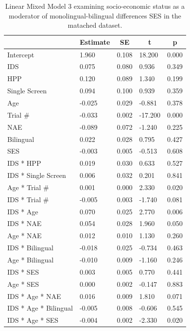 \documentclass[,man,floatsintext]{apa6}
\begin{document}
\begin{table}[tbp]

\begin{center}
\begin{threeparttable}

\caption{\label{tab:unnamed-chunk-11}Linear Mixed Model 3 examining socio-economic status as a moderator of monolingual-bilingual differences SES in the matached dataset.}

\begin{tabular}{lllll}
\toprule
 & \multicolumn{1}{c}{Estimate} & \multicolumn{1}{c}{SE} & \multicolumn{1}{c}{t} & \multicolumn{1}{c}{p}\\
\midrule
Intercept & 1.960 & 0.108 & 18.200 & 0.000\\
IDS & 0.075 & 0.080 & 0.936 & 0.349\\
HPP & 0.120 & 0.089 & 1.340 & 0.199\\
Single Screen & 0.094 & 0.100 & 0.939 & 0.359\\
Age & -0.025 & 0.029 & -0.881 & 0.378\\
Trial \# & -0.033 & 0.002 & -17.200 & 0.000\\
NAE & -0.089 & 0.072 & -1.240 & 0.225\\
Bilingual & 0.022 & 0.028 & 0.795 & 0.427\\
SES & -0.003 & 0.005 & -0.513 & 0.608\\
IDS * HPP & 0.019 & 0.030 & 0.633 & 0.527\\
IDS * Single Screen & 0.006 & 0.032 & 0.201 & 0.841\\
Age * Trial \# & 0.001 & 0.000 & 2.330 & 0.020\\
IDS * Trial \# & -0.005 & 0.003 & -1.740 & 0.081\\
IDS * Age & 0.070 & 0.025 & 2.770 & 0.006\\
IDS * NAE & 0.054 & 0.028 & 1.960 & 0.050\\
Age * NAE & 0.012 & 0.010 & 1.130 & 0.260\\
IDS * Bilingual & -0.018 & 0.025 & -0.734 & 0.463\\
Age * Bilingual & -0.010 & 0.009 & -1.160 & 0.246\\
IDS * SES & 0.003 & 0.005 & 0.770 & 0.441\\
Age * SES & 0.000 & 0.002 & -0.147 & 0.883\\
IDS * Age * NAE & 0.016 & 0.009 & 1.810 & 0.071\\
IDS * Age * Bilingual & -0.005 & 0.008 & -0.606 & 0.545\\
IDS * Age * SES & -0.004 & 0.002 & -2.330 & 0.020\\
\bottomrule
\end{tabular}

\end{threeparttable}
\end{center}

\end{table}
\end{document}
